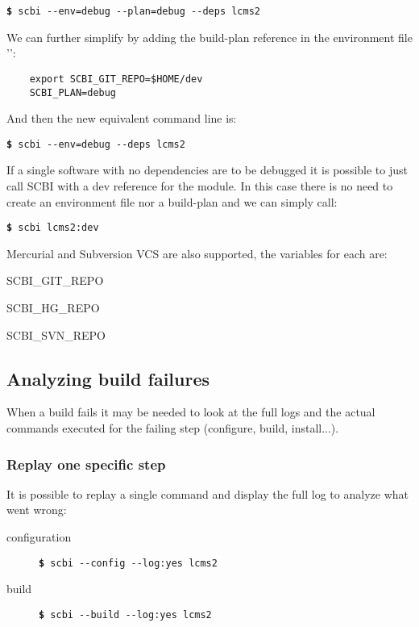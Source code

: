\documentclass[a4paper,12pt,twoside]{article}
\newcommand{\file}[1]{'{\path{#1}}'}
\newcommand{\cmd}[1]{\tabto{1cm}\hspace{0.5cm}\texttt{\textbf{\$} #1}}
\newcommand{\ddash}{-{}-}
\begin{document}
\cmd{scbi \ddash{}env=debug \ddash{}plan=debug \ddash{}deps lcms2}

We can further simplify by adding the build-plan reference in the environment file \file{.env-debug}:

\begin{lstlisting}
	export SCBI_GIT_REPO=$HOME/dev
	SCBI_PLAN=debug
\end{lstlisting}

And then the new equivalent command line is:

\cmd{scbi \ddash{}env=debug \ddash{}deps lcms2}

If a single software with no dependencies are to be debugged it is possible to just call SCBI with a dev reference for the module. In this case there is no need to create an environment file nor a build-plan and we can simply call:

\cmd{scbi lcms2:dev}

Mercurial and Subversion VCS are also supported, the variables for each are:

\begin{description}[style=standard]
	\item[Git] \tabto{3cm} SCBI\_GIT\_REPO
	\item[Mercurial] \tabto{3cm} SCBI\_HG\_REPO
	\item[Subversion] \tabto{3cm} SCBI\_SVN\_REPO
\end{description}

\subsection{Analyzing build failures}
\label{debugging}

When a build fails it may be needed to look at the full logs and the actual commands executed for the failing step (configure, build, install...).

\subsubsection{Replay one specific step}

It is possible to replay a single command and display the full log to analyze what went wrong:

\begin{description}
	\item[configuration] \tabto{3cm}  \cmd{scbi \ddash{}config \ddash{}log:yes lcms2}
	\item[build] \tabto{3cm} \cmd{scbi \ddash{}build \ddash{}log:yes lcms2}
\end{description}
\end{document}

